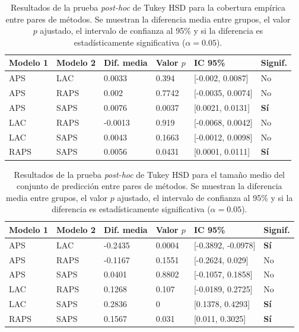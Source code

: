 \renewcommand{\arraystretch}{1.2}
\begin{table}[htbp]
    \small
    \centering
    \begin{tabular}{llllll}
    \toprule
    \textbf{Modelo 1} & \textbf{Modelo 2} & \textbf{Dif. media} & \textbf{Valor $p$} & \textbf{IC 95\%} & \textbf{Signif.} \\ \hline
    APS & LAC & 0.0033 & 0.394 & [-0.002, 0.0087] & No \\
    APS & RAPS & 0.002 & 0.7742 & [-0.0035, 0.0074] & No \\
    APS & SAPS & 0.0076 & 0.0037 & [0.0021, 0.0131] & \textbf{Sí} \\
    LAC & RAPS & -0.0013 & 0.919 & [-0.0068, 0.0042] & No \\
    LAC & SAPS & 0.0043 & 0.1663 & [-0.0012, 0.0098] & No \\
    RAPS & SAPS & 0.0056 & 0.0431 & [0.0001, 0.0111] & \textbf{Sí} \\
    \bottomrule
    \end{tabular}
    \caption[
        Resultados de la prueba \textit{post-hoc} de Tukey HSD para la cobertura empírica entre pares de métodos.
    ]{
        Resultados de la prueba \textit{post-hoc} de Tukey HSD para la cobertura empírica entre pares de métodos.
        Se muestran la diferencia media entre grupos, el valor $p$ ajustado, el intervalo de confianza al 95\% y si la diferencia es estadísticamente significativa ($\alpha = 0.05$).
    }
    \label{tab:AGC_tukey_EC}
\end{table}

\renewcommand{\arraystretch}{1.2}
\begin{table}[htbp]
    \small
    \centering
    \begin{tabular}{llllll}
    \toprule
    \textbf{Modelo 1} & \textbf{Modelo 2} & \textbf{Dif. media} & \textbf{Valor $p$} & \textbf{IC 95\%} & \textbf{Signif.} \\ \hline
    APS & LAC & -0.2435 & 0.0004 & [-0.3892, -0.0978] & \textbf{Sí} \\
    APS & RAPS & -0.1167 & 0.1551 & [-0.2624, 0.029] & No \\
    APS & SAPS & 0.0401 & 0.8802 & [-0.1057, 0.1858] & No \\
    LAC & RAPS & 0.1268 & 0.107 & [-0.0189, 0.2725] & No \\
    LAC & SAPS & 0.2836 & 0 & [0.1378, 0.4293] & \textbf{Sí} \\
    RAPS & SAPS & 0.1567 & 0.031 & [0.011, 0.3025] & \textbf{Sí} \\
    \bottomrule
    \end{tabular}
    \caption[
        Resultados de la prueba \textit{post-hoc} de Tukey HSD para el tamaño medio del conjunto de predicción entre pares de métodos.
    ]{
        Resultados de la prueba \textit{post-hoc} de Tukey HSD para el tamaño medio del conjunto de predicción entre pares de métodos.
        Se muestran la diferencia media entre grupos, el valor $p$ ajustado, el intervalo de confianza al 95\% y si la diferencia es estadísticamente significativa ($\alpha = 0.05$).
    }
    \label{tab:AGC_tukey_MPSS}
\end{table}


